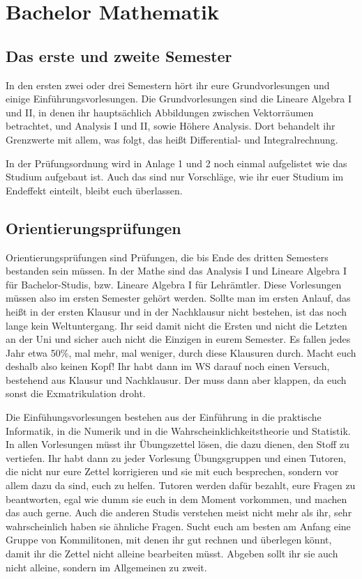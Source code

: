 \section{Bachelor Mathematik}


\subsection{Das erste und zweite Semester}

In den ersten zwei oder drei Semestern hört ihr eure Grundvorlesungen und
einige Einführungsvorlesungen. Die Grundvorlesungen sind die Lineare Algebra I
und II, in denen ihr hauptsächlich Abbildungen zwischen Vektorräumen
betrachtet, und Analysis I und II, sowie Höhere Analysis. Dort behandelt ihr
Grenzwerte mit allem, was folgt, das heißt Differential- und Integralrechnung.

In der Prüfungsordnung wird in Anlage 1 und 2 noch einmal aufgelistet wie das
Studium aufgebaut ist. Auch das sind nur Vorschläge, wie ihr euer Studium im
Endeffekt einteilt, bleibt euch überlassen.

\subsection{Orientierungsprüfungen}

Orientierungsprüfungen sind Prüfungen, die bis Ende des dritten Semesters
bestanden sein müssen. In der Mathe sind das Analysis I und Lineare Algebra I
für Bachelor-Studis, bzw. Lineare Algebra I für Lehrämtler.  Diese Vorlesungen
müssen also im ersten Semester gehört werden.  Sollte man im ersten Anlauf, das
heißt in der ersten Klausur und in der Nachklausur nicht bestehen, ist das noch
lange kein Weltuntergang. Ihr seid damit nicht die Ersten und nicht die Letzten
an der Uni und sicher auch nicht die Einzigen in eurem Semester.  Es fallen
jedes Jahr etwa 50\%, mal mehr, mal weniger, durch diese Klausuren durch. Macht
euch deshalb also keinen Kopf! Ihr habt dann im WS darauf noch einen Versuch,
bestehend aus Klausur und Nachklausur. Der muss dann aber klappen, da euch
sonst die Exmatrikulation droht.

Die Einfühungsvorlesungen bestehen aus der Einführung in die praktische
Informatik, in die Numerik und in die Wahrscheinklichkeitstheorie und
Statistik.  In allen Vorlesungen müsst ihr Übungszettel lösen, die dazu dienen,
den Stoff zu vertiefen.  Ihr habt dann zu jeder Vorlesung Übungsgruppen und
einen Tutoren, die nicht nur eure Zettel korrigieren und sie mit euch
besprechen, sondern vor allem dazu da sind, euch zu helfen.  Tutoren werden
dafür bezahlt, eure Fragen zu beantworten, egal wie dumm sie euch in dem Moment
vorkommen, und machen das auch gerne.  Auch die anderen Studis verstehen meist
nicht mehr als ihr, sehr wahrscheinlich haben sie ähnliche Fragen.  Sucht euch
am besten am Anfang eine Gruppe von Kommilitonen, mit denen ihr gut rechnen und
überlegen könnt, damit ihr die Zettel nicht alleine bearbeiten müsst.  Abgeben
sollt ihr sie auch nicht alleine, sondern im Allgemeinen zu zweit.

